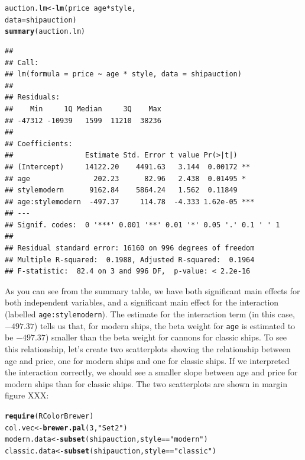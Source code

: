 \documentclass{tufte-book}\usepackage[]{graphicx}\usepackage[]{color}
\makeatletter
\newcommand{\hlnum}[1]{\textcolor[rgb]{0.686,0.059,0.569}{#1}}%
\newcommand{\hlstr}[1]{\textcolor[rgb]{0.192,0.494,0.8}{#1}}%
\newcommand{\hlopt}[1]{\textcolor[rgb]{0,0,0}{#1}}%
\newcommand{\hlstd}[1]{\textcolor[rgb]{0.345,0.345,0.345}{#1}}%
\newcommand{\hlkwb}[1]{\textcolor[rgb]{0.69,0.353,0.396}{#1}}%
\newcommand{\hlkwc}[1]{\textcolor[rgb]{0.333,0.667,0.333}{#1}}%
\newcommand{\hlkwd}[1]{\textcolor[rgb]{0.737,0.353,0.396}{\textbf{#1}}}%
\newenvironment{kframe}{%
 \def\at@end@of@kframe{}%
 \ifinner\ifhmode%
  \def\at@end@of@kframe{\end{minipage}}%
  \begin{minipage}{\columnwidth}%
 \fi\fi%
 \def\FrameCommand##1{\hskip\@totalleftmargin \hskip-\fboxsep
 \colorbox{shadecolor}{##1}\hskip-\fboxsep
     \hskip-\linewidth \hskip-\@totalleftmargin \hskip\columnwidth}%
 \MakeFramed {\advance\hsize-\width
   \@totalleftmargin\z@ \linewidth\hsize
   \@setminipage}}%
 {\par\unskip\endMakeFramed%
 \at@end@of@kframe}
\newenvironment{knitrout}{}{} %
\makeatother
\begin{document}
\begin{footnotesize}
\begin{knitrout}
\color{fgcolor}\begin{kframe}
\begin{alltt}
\hlstd{auction.lm} \hlkwb{<-} \hlkwd{lm}\hlstd{(price} \hlopt{~} \hlstd{age} \hlopt{*} \hlstd{style,}
                 \hlkwc{data} \hlstd{= shipauction)}
\hlkwd{summary}\hlstd{(auction.lm)}
\end{alltt}
\begin{verbatim}
## 
## Call:
## lm(formula = price ~ age * style, data = shipauction)
## 
## Residuals:
##    Min     1Q Median     3Q    Max 
## -47312 -10939   1599  11210  38236 
## 
## Coefficients:
##                 Estimate Std. Error t value Pr(>|t|)    
## (Intercept)     14122.20    4491.63   3.144  0.00172 ** 
## age               202.23      82.96   2.438  0.01495 *  
## stylemodern      9162.84    5864.24   1.562  0.11849    
## age:stylemodern  -497.37     114.78  -4.333 1.62e-05 ***
## ---
## Signif. codes:  0 '***' 0.001 '**' 0.01 '*' 0.05 '.' 0.1 ' ' 1
## 
## Residual standard error: 16160 on 996 degrees of freedom
## Multiple R-squared:  0.1988,	Adjusted R-squared:  0.1964 
## F-statistic:  82.4 on 3 and 996 DF,  p-value: < 2.2e-16
\end{verbatim}
\end{kframe}
\end{knitrout}

As you can see from the summary table, we have both significant main effects for both independent variables, and a significant main effect for the interaction (labelled \texttt{age:stylemodern}). The estimate for the interaction term (in this case, \ensuremath{-497.37}) tells us that, for modern ships, the beta weight for \texttt{age} is estimated to be \ensuremath{-497.37}) smaller than the beta weight for cannons for classic ships. To see this relationship, let's create two scatterplots showing the relationship between age and price, one for modern ships and one for classic ships. If we interpreted the interaction correctly, we should see a smaller slope between age and price for modern ships than for classic ships. The two scatterplots are shown in margin figure XXX:

\begin{marginfigure}
\begin{tiny}
\begin{knitrout}
\color{fgcolor}\begin{kframe}
\begin{alltt}
\hlkwd{require}\hlstd{(RColorBrewer)}
\hlstd{col.vec} \hlkwb{<-} \hlkwd{brewer.pal}\hlstd{(}\hlnum{3}\hlstd{,} \hlstr{"Set2"}\hlstd{)}
\hlstd{modern.data} \hlkwb{<-} \hlkwd{subset}\hlstd{(shipauction, style} \hlopt{==} \hlstr{"modern"}\hlstd{)}
\hlstd{classic.data} \hlkwb{<-} \hlkwd{subset}\hlstd{(shipauction, style} \hlopt{==} \hlstr{"classic"}\hlstd{)}


\end{alltt}
\end{kframe}
\end{knitrout}
\end{tiny}
\end{marginfigure}
\end{footnotesize}
\end{document}
